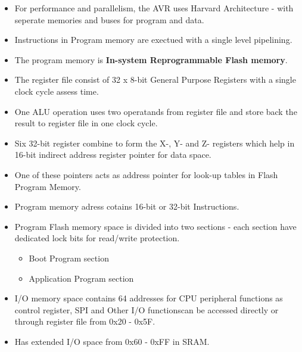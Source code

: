 \documentclass{article}
\begin{document}
\begin{itemize}
    \item For performance and parallelism, the AVR uses Harvard Architecture - with seperate memories and buses for program and data.
    \item Instructions in Program memory are exectued with a single level pipelining.
    \item The program memory is  \textbf{In-system Reprogrammable Flash memory}.
    \item The register file consist of 32 x 8-bit General Purpose Registers with a single clock cycle assess time.
    \item One ALU operation uses two operatands from register file and store back the result to register file in one clock cycle.
    \item Six 32-bit register combine to form the X-, Y- and Z- registers which help in 16-bit indirect address register pointer for data space.
    \item One of these pointers acts as address pointer for look-up tables in Flash Program Memory.
    \item Program memory adress cotains 16-bit or 32-bit Instructions.
    \item Program Flash memory space is divided into two sections - each section have dedicated lock bits for read/write protection.
    \begin{itemize}
        \item Boot Program section
        \item Application Program section
    \end{itemize}
    \item I/O memory space contains 64 addresses for CPU peripheral functions as control register, SPI and Other I/O functionscan be accessed directly or through register file from 0x20 - 0x5F.
    \item Has extended I/O space from 0x60 - 0xFF in SRAM.
\end{itemize}
\end{document}
